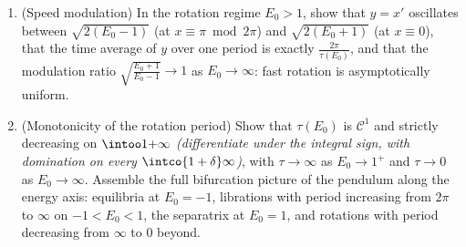 \begin{problem}
\begin{enumerate}[resume]
  \item (Speed modulation) In the rotation regime $E_0 > 1$,
        show that $y = x'$ oscillates between
        $\sqrt{2(E_0 - 1)}$ (at $x \equiv \pi \bmod 2\pi$)
        and $\sqrt{2(E_0 + 1)}$ (at $x \equiv 0$), that the
        time average of $y$ over one period is exactly
        $\frac{2\pi}{\tau(E_0)}$, and that the modulation
        ratio $\sqrt{\frac{E_0 + 1}{E_0 - 1}} \to 1$ as $E_0
        \to \infty$: fast rotation is asymptotically
        uniform.
  \item (Monotonicity of the rotation period) Show that
        $\tau(E_0)$ is $\mathcal C^1$ and strictly
        decreasing on $\intoo1{+\infty}$
        \emph{(differentiate under the integral sign, with
        domination on every $\intco{1 + \delta}\infty$)},
        with $\tau \to \infty$ as $E_0 \to 1^+$ and $\tau
        \to 0$ as $E_0 \to \infty$. Assemble the full
        bifurcation picture of the pendulum along the
        energy axis: equilibria at $E_0 = -1$, librations
        with period increasing from $2\pi$ to $\infty$ on
        $-1 < E_0 < 1$, the separatrix at $E_0 = 1$, and
        rotations with period decreasing from $\infty$ to
        $0$ beyond.
\end{enumerate}
\end{problem}
